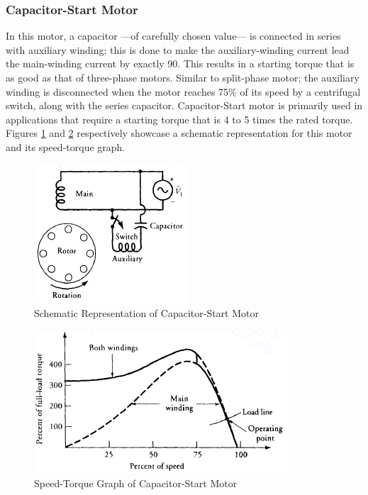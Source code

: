 \documentclass[journal]{IEEEtran}
\begin{document}
\subsubsection{Capacitor-Start Motor}
In this motor, a capacitor —of carefully chosen value— is connected in series with auxiliary winding; this is done to make the auxiliary-winding current lead the main-winding current by exactly 90\textdegree. This results in a starting torque that is as good as that of three-phase motors. Similar to split-phase motor; the auxiliary winding is disconnected when the motor reaches 75\% of its speed by a centrifugal switch, along with the series capacitor. Capacitor-Start motor is primarily used in applications that require a starting torque that is 4 to 5 times the rated torque\cite{guru2007}. Figures \ref{fig:capstartsch} and \ref{fig:capstartsgraph} respectively showcase a schematic representation for this motor and its speed-torque graph.
\begin{figure}[h]
    \centering
    \includegraphics[scale=0.67]{Induction/cap_start_sch.PNG}
    \caption{Schematic Representation of Capacitor-Start Motor \cite{guru2007}}
    \label{fig:capstartsch}
\end{figure}
\begin{figure}[h]
    \centering
    \includegraphics[scale=0.57]{Induction/cap_start_graph.PNG}
    \caption{Speed-Torque Graph of Capacitor-Start Motor \cite{guru2007}}
    \label{fig:capstartsgraph}
\end{figure}
\end{document}
